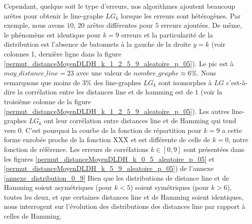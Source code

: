 Cependant, quelque soit le type d'erreurs, nos algorithmes ajoutent beaucoup ar\^etes pour obtenir le line-graphe $LG_k$ lorsque les erreurs sont h\'et\'erog\`enes. Par exemple, nous avons $10$, $20$ ar\^etes diff\'erentes  pour $5$ erreurs ajout\'ees.
\newline
De m\^eme, le ph\'enom\`ene est identique pour $k  = 9$ erreurs et la particularit\'e de la distribution est l'absence de batonnets \`a la gauche de la droite $y = k$ (voir colonnes 1, derni\`ere ligne dans la figure \ref{permut_distanceMoyenDLDH_k_1_2_5_9_aleatoire_p_05}).
Le pic est \`a $moy\_distance\_line = 23$ avec une valeur de $nombre\_graphe \approx 6 \%$.
Nous remarquons que moins de $3\%$ des line-graphes $LG_k$ sont isomorphes \`a $LG$ c'est-\`a-dire la corr\'elation entre les distances line et de hamming est de $1$ (voir la troisi\`eme colonne de la figure \ref{permut_distanceMoyenDLDH_k_1_2_5_9_aleatoire_p_05}). 
Les autres line-graphes $LG_k$ ont leur corr\'elation entre distances line et de Hamming qui tend vers $0$.  C'est pourquoi la courbe de la fonction de r\'epartition  pour $k=9$  a cette forme enrob\'ee proche de la fonction  XXX  et est diff\'erente de celle de $k=0$, notre fonction de r\'ef\'erence.
Les erreurs de corr\'elations $k \in [0,9]$ sont pr\'esent\'ees dans les figures \ref{permut_distanceMoyenDLDH_k_0_5_aleatoire_p_05} et  \ref{permut_distanceMoyenDLDH_k_5_9_aleatoire_p_05}) de l'annexe \ref{annexe_distribution_0_9}
\newline
Bien que les distributions de distance line et de Hamming soient asym\'etriques (pour $k < 5$) soient sym\'etriques (pour $k>6$), toutes les deux, et que certaines distances line et de Hamming soient identiques, nous interrogent sur l'\'evolution des distributions des distances line par rapport \`a celles de Hamming. 




